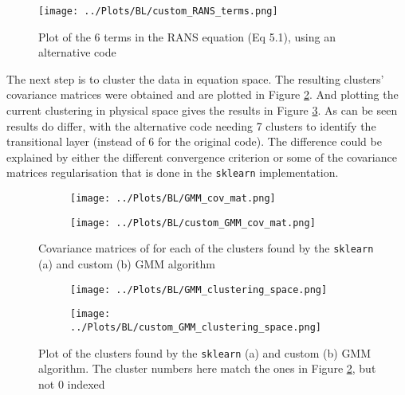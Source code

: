 \documentclass[12pt]{report} %
\begin{document}
\begin{figure}[htbp]
  \centering
  \texttt{[image: ../Plots/BL/custom\_RANS\_terms.png]}
  \caption{Plot of the 6 terms in the RANS equation (Eq 5.1), using an alternative code}
  \label{fig:custom_RANS_terms}
\end{figure}

\newpage

The next step is to cluster the data in equation space. The resulting clusters' covariance matrices were obtained and are plotted in Figure \ref{fig:GMM_cov_mat}. And plotting the current clustering in physical space gives the results in Figure \ref{fig:GMM_clusters}. As can be seen results do differ, with the alternative code needing 7 clusters to identify the transitional layer (instead of 6 for the original code). The difference could be explained by either the different convergence criterion or some of the covariance matrices regularisation that is done in the \texttt{sklearn} implementation\cite{sklearnGMM}.

\begin{figure}[htbp]
  \centering
  \begin{subfigure}[b]{0.7\textwidth}
      \texttt{[image: ../Plots/BL/GMM\_cov\_mat.png]}
      \caption{}
  \end{subfigure}
  \begin{subfigure}[b]{0.7\textwidth}
      \texttt{[image: ../Plots/BL/custom\_GMM\_cov\_mat.png]}
      \caption{}
  \end{subfigure}
  \caption{Covariance matrices of for each of the clusters found by the \texttt{sklearn} (a) and custom (b) GMM algorithm}
  \label{fig:GMM_cov_mat}
\end{figure}


\begin{figure}[htbp]
  \centering
  \begin{subfigure}[b]{0.7\textwidth}
      \texttt{[image: ../Plots/BL/GMM\_clustering\_space.png]}
      \caption{}
  \end{subfigure}
  \begin{subfigure}[b]{0.7\textwidth}
      \texttt{[image: ../Plots/BL/custom\_GMM\_clustering\_space.png]}
      \caption{}
  \end{subfigure}
  \caption{Plot of the clusters found by the \texttt{sklearn} (a) and custom (b) GMM algorithm. The cluster numbers here match the ones in Figure \ref{fig:GMM_cov_mat}, but not 0 indexed}
  \label{fig:GMM_clusters}
\end{figure}
\end{document}
